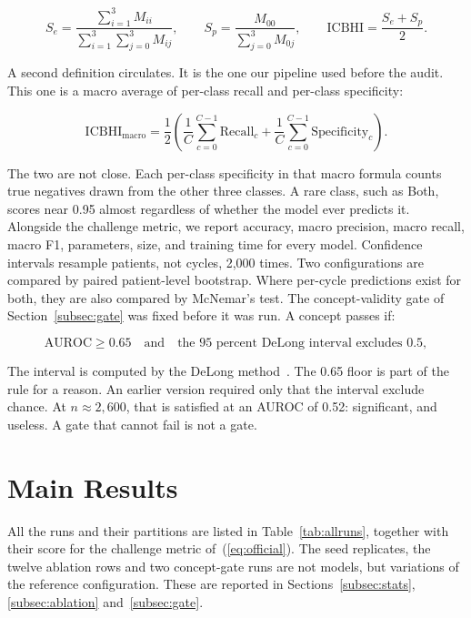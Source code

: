 \documentclass[journal,onecolumn]{IEEEtran}
\begin{document}
\begin{equation}
S_e = \frac{\sum_{i=1}^{3} M_{ii}}{\sum_{i=1}^{3}\sum_{j=0}^{3} M_{ij}},
\qquad
S_p = \frac{M_{00}}{\sum_{j=0}^{3} M_{0j}},
\qquad
\mathrm{ICBHI} = \frac{S_e + S_p}{2}.
\label{eq:official}
\end{equation}

A second definition circulates. It is the one our pipeline used before the audit. This
one is a macro average of per-class recall and per-class specificity:

\begin{equation}
\mathrm{ICBHI}_{\mathrm{macro}} = \frac{1}{2}\left(
\frac{1}{C}\sum_{c=0}^{C-1}\mathrm{Recall}_c +
\frac{1}{C}\sum_{c=0}^{C-1}\mathrm{Specificity}_c \right).
\label{eq:macro}
\end{equation}

The two are not close. Each per-class specificity in that macro formula counts true
negatives drawn from the other three classes. A rare class, such as Both, scores near
0.95 almost regardless of whether the model ever predicts it. Alongside the challenge
metric, we report accuracy, macro precision, macro recall, macro F1, parameters, size,
and training time for every model. Confidence intervals resample patients, not cycles,
2,000 times. Two configurations are compared by paired patient-level bootstrap. Where
per-cycle predictions exist for both, they are also compared by McNemar's test. The
concept-validity gate of Section~\ref{subsec:gate} was fixed before it was run. A
concept passes if:

\begin{equation}
\mathrm{AUROC} \geq 0.65 \quad\text{and}\quad \text{the 95 percent DeLong interval excludes } 0.5,
\label{eq:gate}
\end{equation}

The interval is computed by the DeLong method~\cite{delong1988auc}. The 0.65 floor is
part of the rule for a reason. An earlier version required only that the interval
exclude chance. At $n \approx 2{,}600$, that is satisfied at an AUROC of 0.52:
significant, and useless. A gate that cannot fail is not a gate.

\section{Main Results}
\label{sec:results}

All the runs and their partitions are listed in Table~\ref{tab:allruns}, together with their score for the challenge metric of~(\ref{eq:official}). The seed replicates, the twelve ablation rows and two concept-gate runs are not models, but variations of the reference configuration. These are reported in Sections~\ref{subsec:stats}, \ref{subsec:ablation} and~\ref{subsec:gate}.
\end{document}
